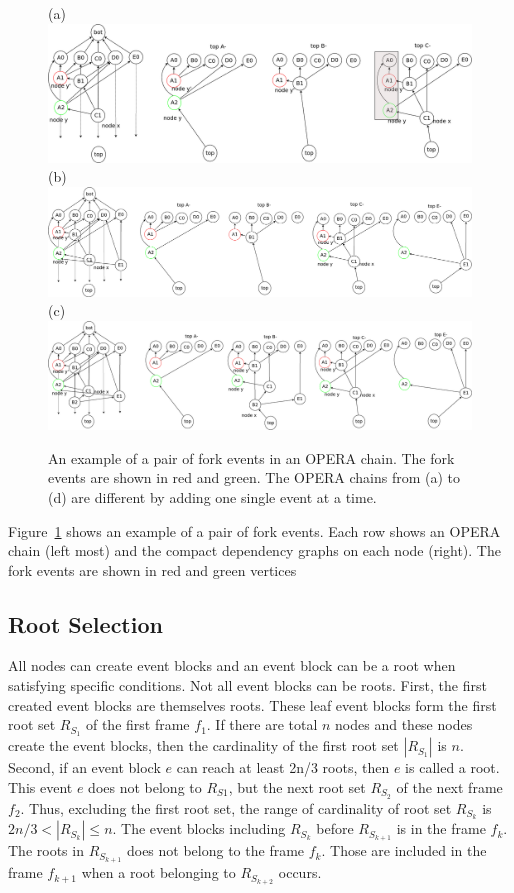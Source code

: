 \documentclass{article}
\begin{document}
\begin{figure}[H]	\centering
	(a)\includegraphics[width=0.9\linewidth]{deptrees_fork}\\	(b)\includegraphics[width=0.9\linewidth]{deptrees_fork_add1event}\\
	(c)\includegraphics[width=0.9\linewidth]{deptrees_fork_add2event}
	\caption{An example of a pair of fork events in an OPERA chain. The fork events are shown in red and green. The OPERA chains from (a) to (d) are different by adding one single event at a time.}
	\label{fig:deptreesfork1}
\end{figure}

Figure~\ref{fig:deptreesfork1} shows an example of a pair of fork events. Each row shows an OPERA chain (left most) and the compact dependency graphs on each node (right). The fork events are shown in red and green vertices

\subsection{Root Selection}
All nodes can create event blocks and an event block can be a root when satisfying specific conditions. Not all event blocks can be roots. First, the first created event blocks are themselves roots. These leaf event blocks form the first root set $R_{S_1}$ of the first frame $f_1$. If there are total $n$ nodes and these nodes create the event blocks, then the cardinality of the first root set $|R_{S_1}|$ is $n$. Second, if an event block $e$ can reach at least 2n/3 roots, then $e$ is called a root. This event $e$ does not belong to $R_{S1}$, but the next root set $R_{S_2}$ of the next frame $f_2$. Thus, excluding the first root set, the range of cardinality of root set $R_{S_k}$ is $2n/3 < |R_{S_k}| \leq n$. The event blocks including $R_{S_k}$ before $R_{S_{k+1}}$ is in the frame $f_k$. The roots in $R_{S_{k+1}}$ does not belong to the frame $f_k$. Those are included in the frame $f_{k+1}$ when a root belonging to $R_{S_{k+2}}$ occurs.  
\end{document}
